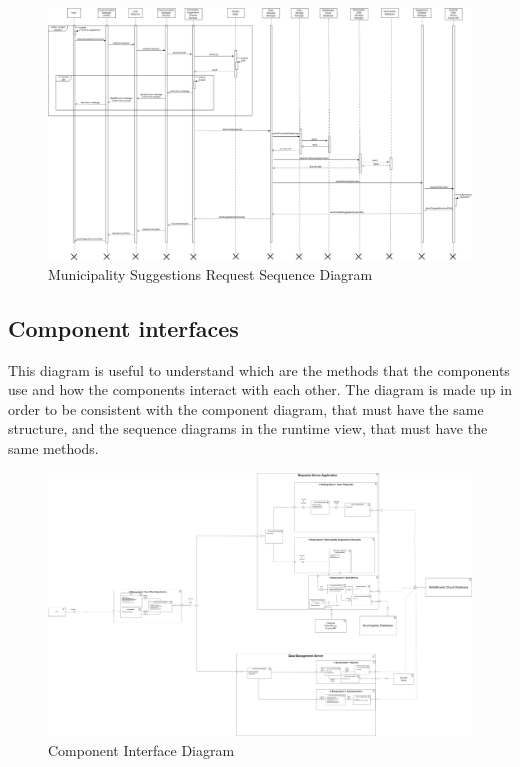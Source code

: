 \documentclass[titlepage]{article}
\begin{document}
\begin{figure}[h]
	\includegraphics[scale=0.215]{Diagrams/Sequence Diagrams/Runtime View Diagram suggestions.png}
	\caption{Municipality Suggestions Request Sequence Diagram}
\end{figure}
\FloatBarrier
\newpage



\subsection{Component interfaces}

This diagram is useful to understand which are the methods that the components use and how the components interact with each other. The diagram is made up in order to be consistent with the component diagram, that must have the same structure, and the sequence diagrams in the runtime view, that must have the same methods.\\


\begin{figure}[h]
	\includegraphics[scale=0.108]{Diagrams/Component Interface Diagram.png}
	\caption{Component Interface Diagram}
\end{figure}
\FloatBarrier
\end{document}
